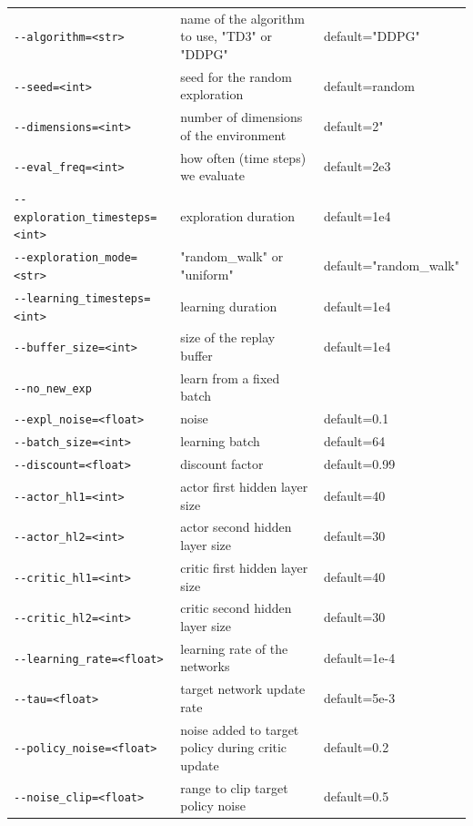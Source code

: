 \documentclass{article}
\begin{document}
\def\arraystretch{1.5}%
\begin{center}
\begin{longtable}{l l l}
    \lstinline|--algorithm=<str>| & name of the algorithm to use, "TD3" or "DDPG" & default="DDPG"\\
    \lstinline|--seed=<int>| & seed for the random exploration & default=random\\
    \lstinline|--dimensions=<int>| & number of dimensions of the environment & default=2"\\
    \lstinline|--eval_freq=<int>| & how often (time steps) we evaluate & default=2e3\\
    \lstinline|--exploration_timesteps=<int>| & exploration duration & default=1e4\\
    \lstinline|--exploration_mode=<str>| & "random\_walk" or "uniform" &  default="random\_walk"\\
    \lstinline|--learning_timesteps=<int>| & learning duration & default=1e4\\
    \lstinline|--buffer_size=<int>| & size of the replay buffer & default=1e4\\
    \lstinline|--no_new_exp| & learn from a fixed batch &\\
    \lstinline|--expl_noise=<float>| & noise & default=0.1\\
    \lstinline|--batch_size=<int>| & learning batch & default=64\\
    \lstinline|--discount=<float>| & discount factor & default=0.99\\
    \lstinline|--actor_hl1=<int>| & actor first hidden layer size & default=40\\
    \lstinline|--actor_hl2=<int>| & actor second hidden layer size & default=30\\
    \lstinline|--critic_hl1=<int>| & critic first hidden layer size & default=40\\
    \lstinline|--critic_hl2=<int>| & critic second hidden layer size & default=30\\
    \lstinline|--learning_rate=<float>| & learning rate of the networks & default=1e-4\\
    \lstinline|--tau=<float>| & target network update rate & default=5e-3\\
    \lstinline|--policy_noise=<float>| & noise added to target policy during critic update & default=0.2\\
    \lstinline|--noise_clip=<float>| & range to clip target policy noise & default=0.5\\

\end{longtable}
\end{center}
\end{document}

